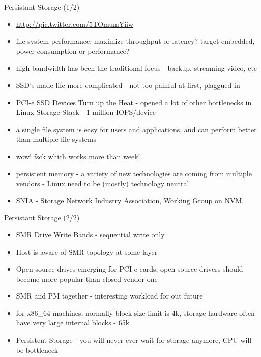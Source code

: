 \documentclass[aspectratio=169]{beamer}
\begin{document}
\begin{frame}{Persistant Storage (1/2)}
  \begin{itemize}
  \item \url{http://pic.twitter.com/5TOmumYiiw}
  \item file system performance: maximize throughput or latency? target embedded, power consumption or performance?
  \item high bandwidth has been the traditional focus - backup, streaming video, etc
  \item SSD's made life more complicated - not too painful at first, plaggued in
  \item PCI-e SSD Devices Turn up the Heat - opened a lot of other bottlenecks in Linux Storage Stack - 1 million IOPS/device
  \item a single file system is easy for users and applications, and can perform better than multiple file systems
  \item wow! fsck which works more than week!
  \item persistent memory - a variety of new technologies are coming from multiple vendors - Linux need to be (mostly) technology neutral
  \item SNIA - Storage Network Industry Association, Working Group on NVM.
  \end{itemize}
\end{frame} 
  
\begin{frame}{Persistant Storage (2/2)}
  \begin{itemize}
  \item SMR Drive Write Bands - sequential write only
  \item Host is aware of SMR topology at some layer
  \item Open source drives emerging for PCI-e cards, open source drivers should become more popular than closed vendor one
  \item SMR and PM together - interesting workload for out future
  \item for x86\_64 machines, normally block size limit is 4k, storage hardware often have very large internal blocks - 65k
  \item Persistent Storage - you will never ever wait for storage anymore, CPU will be bottleneck
  \end{itemize}
\end{frame} 
\end{document}
